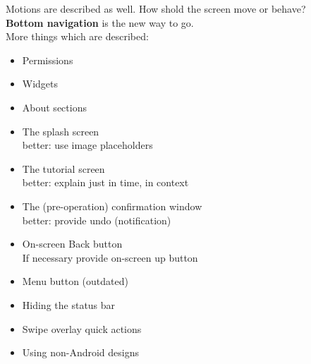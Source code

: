 \begin{breakbox}

Motions are described as well. How shold the screen move or
behave?\\
\textbf{Bottom navigation} is the new way to go.\\
More things which are described: 
\begin{itemize}
    \item Permissions
    \item Widgets
    \item About sections
\end{itemize}
\end{breakbox}

\begin{breakbox}

\begin{itemize}
\tightlist
\item
  The splash screen\\
  better: use image placeholders
\item
  The tutorial screen\\
  better: explain just in time, in context
\item
  The (pre-operation) confirmation window\\
  better: provide undo (notification)
\item
  On-screen Back button\\
  If necessary provide on-screen up button
\item
  Menu button (outdated)
\item
  Hiding the status bar
\item
  Swipe overlay quick actions
\item
  Using non-Android designs
\end{itemize}

\end{breakbox}

